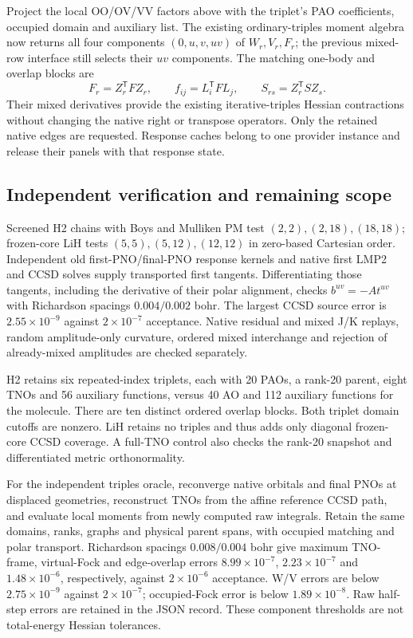 \documentclass[11pt]{article}
\begin{document}
Project the local OO/OV/VV factors above with the triplet's PAO coefficients,
occupied domain and auxiliary list. The existing ordinary-triples moment
algebra now returns all four components $(0,u,v,uv)$ of $W_r,V_r,F_r$;
the previous mixed-row interface still selects their $uv$ components.
The matching one-body and overlap blocks are
\begin{equation}
 F_r=Z_r^{\mathsf T}FZ_r,\qquad f_{ij}=L_i^{\mathsf T}FL_j,
 \qquad S_{rs}=Z_r^{\mathsf T}SZ_s.
\end{equation}
Their mixed derivatives provide the existing iterative-triples Hessian
contractions without changing the native right or transpose operators.
Only the retained native edges are requested. Response caches belong to
one provider instance and release their panels with that response state.

\subsection{Independent verification and remaining scope}
Screened H2 chains with Boys and Mulliken PM test $(2,2),(2,18),(18,18)$;
frozen-core LiH tests $(5,5),(5,12),(12,12)$ in zero-based Cartesian order.
Independent old first-PNO/final-PNO response kernels and native first LMP2
and CCSD solves supply transported first tangents. Differentiating those
tangents, including the derivative of their polar alignment, checks
$b^{uv}=-At^{uv}$ with Richardson spacings $0.004/0.002$ bohr.
The largest CCSD source error is $2.55\times10^{-9}$ against
$2\times10^{-7}$ acceptance. Native residual and mixed J/K replays,
random amplitude-only curvature, ordered mixed interchange and rejection
of already-mixed amplitudes are checked separately.

H2 retains six repeated-index triplets, each with 20 PAOs, a rank-20 parent,
eight TNOs and 56 auxiliary functions, versus 40 AO and 112 auxiliary
functions for the molecule. There are ten distinct ordered overlap blocks.
Both triplet domain cutoffs are nonzero. LiH retains no triples and thus
adds only diagonal frozen-core CCSD coverage. A full-TNO control also
checks the rank-20 snapshot and differentiated metric orthonormality.

For the independent triples oracle, reconverge native orbitals and final
PNOs at displaced geometries, reconstruct TNOs from the affine reference
CCSD path, and evaluate local moments from newly computed raw integrals.
Retain the same domains, ranks, graphs and physical parent spans, with
occupied matching and polar transport. Richardson spacings
$0.008/0.004$ bohr give maximum TNO-frame, virtual-Fock and edge-overlap
errors $8.99\times10^{-7}$, $2.23\times10^{-7}$ and $1.48\times10^{-6}$,
respectively, against $2\times10^{-6}$ acceptance. W/V errors are below
$2.75\times10^{-9}$ against $2\times10^{-7}$; occupied-Fock error is below
$1.89\times10^{-8}$. Raw half-step errors are retained in the JSON record.
These component thresholds are not total-energy Hessian tolerances.
\end{document}
